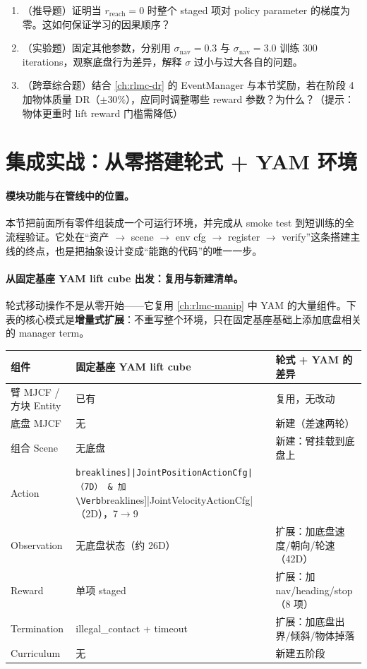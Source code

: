 \begin{practice}[奖励设计]
\begin{enumerate}
\item （推导题）证明当 $r_{\text{reach}}=0$ 时整个 staged 项对 policy parameter 的梯度为零。这如何保证学习的因果顺序？
\item （实验题）固定其他参数，分别用 $\sigma_{\text{nav}}=0.3$ 与 $\sigma_{\text{nav}}=3.0$ 训练 $300$ iterations，观察底盘行为差异，解释 $\sigma$ 过小与过大各自的问题。
\item （跨章综合题）结合 \cref{ch:rlmc-dr} 的 EventManager 与本节奖励，若在阶段 4 加物体质量 DR（$\pm 30\%$），应同时调整哪些 reward 参数？为什么？（提示：物体更重时 lift reward 门槛需降低）
\end{enumerate}
\end{practice}

\section{集成实战：从零搭建轮式 + YAM 环境}
\label{sec:rlmc-wh-integration}

\paragraph{模块功能与在管线中的位置。}本节把前面所有零件组装成一个可运行环境，并完成从 smoke test 到短训练的全流程验证。它处在“资产 $\to$ scene $\to$ env cfg $\to$ register $\to$ verify”这条搭建主线的终点，也是把抽象设计变成“能跑的代码”的唯一一步。

\paragraph{从固定基座 YAM lift cube 出发：复用与新建清单。}轮式移动操作不是从零开始——它复用 \cref{ch:rlmc-manip} 中 YAM 的大量组件。下表的核心模式是\textbf{增量式扩展}：不重写整个环境，只在固定基座基础上添加底盘相关的 manager term。

\begin{center}
\small
\begin{tabular}{@{}llp{3.6cm}@{}}
\toprule
组件 & 固定基座 YAM lift cube & 轮式 + YAM 的差异 \\
\midrule
臂 MJCF / 方块 Entity & 已有 & 复用，无改动 \\
底盘 MJCF & 无 & 新建（差速两轮） \\
组合 Scene & 无底盘 & 新建：臂挂载到底盘上 \\
Action & \Verb[breaklines]|JointPositionActionCfg|（7D） & 加 \Verb[breaklines]|JointVelocityActionCfg|（2D），7$\to$9 \\
Observation & 无底盘状态（约 26D） & 扩展：加底盘速度/朝向/轮速（42D） \\
Reward & 单项 staged & 扩展：加 nav/heading/stop（8 项） \\
Termination & illegal\_contact + timeout & 扩展：加底盘出界/倾斜/物体掉落 \\
Curriculum & 无 & 新建五阶段 \\
\bottomrule
\end{tabular}
\end{center}

